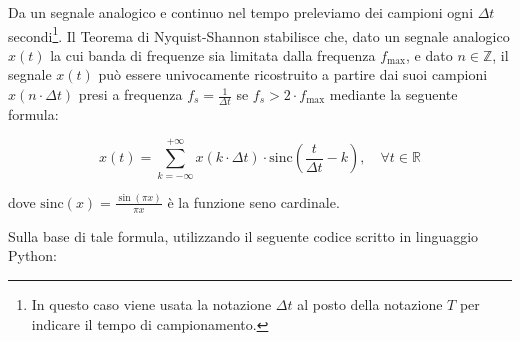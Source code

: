 \documentclass[a4paper,12pt]{report}  %
\begin{document}
Da un segnale analogico e continuo nel tempo preleviamo dei campioni ogni $\Delta t$ secondi\footnote{In questo caso viene usata la notazione $\Delta t$ al posto della notazione $T$ per indicare il tempo di campionamento.}.
Il Teorema di Nyquist-Shannon stabilisce che, dato un segnale analogico $x(t)$ la cui banda di frequenze sia limitata dalla frequenza $f_{\text{max}}$, e dato $n \in \mathbb{Z}$, il segnale $x(t)$ può essere univocamente ricostruito a partire dai suoi campioni $x(n \cdot \Delta t)$ presi a frequenza $f_s = \frac{1}{\Delta t}$ se $f_s > 2 \cdot f_{\text{max}}$ mediante la seguente formula:

\begin{equation}
    x(t) = \sum_{k = -\infty}^{+\infty} x(k \cdot \Delta t) \cdot \text{sinc}\left( \frac{t}{\Delta t} - k \right), \quad \forall t \in \mathbb{R} \nonumber
\end{equation}

dove $\text{sinc}(x) = \frac{\sin(\pi x)}{\pi x}$ è la funzione seno cardinale.

Sulla base di tale formula, utilizzando il seguente codice scritto in linguaggio Python:
\end{document}

